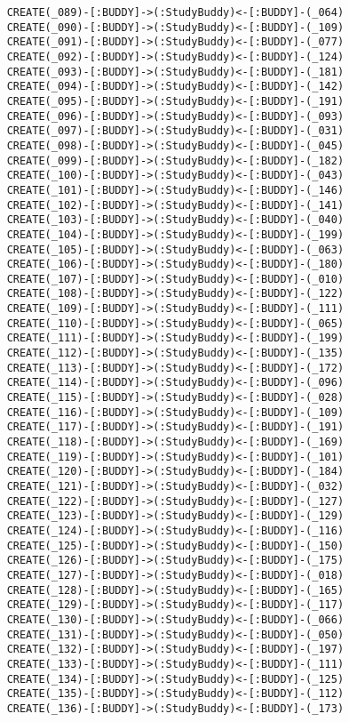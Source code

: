 \begin{lstlisting}
	CREATE(_089)-[:BUDDY]->(:StudyBuddy)<-[:BUDDY]-(_064)
	CREATE(_090)-[:BUDDY]->(:StudyBuddy)<-[:BUDDY]-(_109)
	CREATE(_091)-[:BUDDY]->(:StudyBuddy)<-[:BUDDY]-(_077)
	CREATE(_092)-[:BUDDY]->(:StudyBuddy)<-[:BUDDY]-(_124)
	CREATE(_093)-[:BUDDY]->(:StudyBuddy)<-[:BUDDY]-(_181)
	CREATE(_094)-[:BUDDY]->(:StudyBuddy)<-[:BUDDY]-(_142)
	CREATE(_095)-[:BUDDY]->(:StudyBuddy)<-[:BUDDY]-(_191)
	CREATE(_096)-[:BUDDY]->(:StudyBuddy)<-[:BUDDY]-(_093)
	CREATE(_097)-[:BUDDY]->(:StudyBuddy)<-[:BUDDY]-(_031)
	CREATE(_098)-[:BUDDY]->(:StudyBuddy)<-[:BUDDY]-(_045)
	CREATE(_099)-[:BUDDY]->(:StudyBuddy)<-[:BUDDY]-(_182)
	CREATE(_100)-[:BUDDY]->(:StudyBuddy)<-[:BUDDY]-(_043)
	CREATE(_101)-[:BUDDY]->(:StudyBuddy)<-[:BUDDY]-(_146)
	CREATE(_102)-[:BUDDY]->(:StudyBuddy)<-[:BUDDY]-(_141)
	CREATE(_103)-[:BUDDY]->(:StudyBuddy)<-[:BUDDY]-(_040)
	CREATE(_104)-[:BUDDY]->(:StudyBuddy)<-[:BUDDY]-(_199)
	CREATE(_105)-[:BUDDY]->(:StudyBuddy)<-[:BUDDY]-(_063)
	CREATE(_106)-[:BUDDY]->(:StudyBuddy)<-[:BUDDY]-(_180)
	CREATE(_107)-[:BUDDY]->(:StudyBuddy)<-[:BUDDY]-(_010)
	CREATE(_108)-[:BUDDY]->(:StudyBuddy)<-[:BUDDY]-(_122)
	CREATE(_109)-[:BUDDY]->(:StudyBuddy)<-[:BUDDY]-(_111)
	CREATE(_110)-[:BUDDY]->(:StudyBuddy)<-[:BUDDY]-(_065)
	CREATE(_111)-[:BUDDY]->(:StudyBuddy)<-[:BUDDY]-(_199)
	CREATE(_112)-[:BUDDY]->(:StudyBuddy)<-[:BUDDY]-(_135)
	CREATE(_113)-[:BUDDY]->(:StudyBuddy)<-[:BUDDY]-(_172)
	CREATE(_114)-[:BUDDY]->(:StudyBuddy)<-[:BUDDY]-(_096)
	CREATE(_115)-[:BUDDY]->(:StudyBuddy)<-[:BUDDY]-(_028)
	CREATE(_116)-[:BUDDY]->(:StudyBuddy)<-[:BUDDY]-(_109)
	CREATE(_117)-[:BUDDY]->(:StudyBuddy)<-[:BUDDY]-(_191)
	CREATE(_118)-[:BUDDY]->(:StudyBuddy)<-[:BUDDY]-(_169)
	CREATE(_119)-[:BUDDY]->(:StudyBuddy)<-[:BUDDY]-(_101)
	CREATE(_120)-[:BUDDY]->(:StudyBuddy)<-[:BUDDY]-(_184)
	CREATE(_121)-[:BUDDY]->(:StudyBuddy)<-[:BUDDY]-(_032)
	CREATE(_122)-[:BUDDY]->(:StudyBuddy)<-[:BUDDY]-(_127)
	CREATE(_123)-[:BUDDY]->(:StudyBuddy)<-[:BUDDY]-(_129)
	CREATE(_124)-[:BUDDY]->(:StudyBuddy)<-[:BUDDY]-(_116)
	CREATE(_125)-[:BUDDY]->(:StudyBuddy)<-[:BUDDY]-(_150)
	CREATE(_126)-[:BUDDY]->(:StudyBuddy)<-[:BUDDY]-(_175)
	CREATE(_127)-[:BUDDY]->(:StudyBuddy)<-[:BUDDY]-(_018)
	CREATE(_128)-[:BUDDY]->(:StudyBuddy)<-[:BUDDY]-(_165)
	CREATE(_129)-[:BUDDY]->(:StudyBuddy)<-[:BUDDY]-(_117)
	CREATE(_130)-[:BUDDY]->(:StudyBuddy)<-[:BUDDY]-(_066)
	CREATE(_131)-[:BUDDY]->(:StudyBuddy)<-[:BUDDY]-(_050)
	CREATE(_132)-[:BUDDY]->(:StudyBuddy)<-[:BUDDY]-(_197)
	CREATE(_133)-[:BUDDY]->(:StudyBuddy)<-[:BUDDY]-(_111)
	CREATE(_134)-[:BUDDY]->(:StudyBuddy)<-[:BUDDY]-(_125)
	CREATE(_135)-[:BUDDY]->(:StudyBuddy)<-[:BUDDY]-(_112)
	CREATE(_136)-[:BUDDY]->(:StudyBuddy)<-[:BUDDY]-(_173)

\end{lstlisting}
